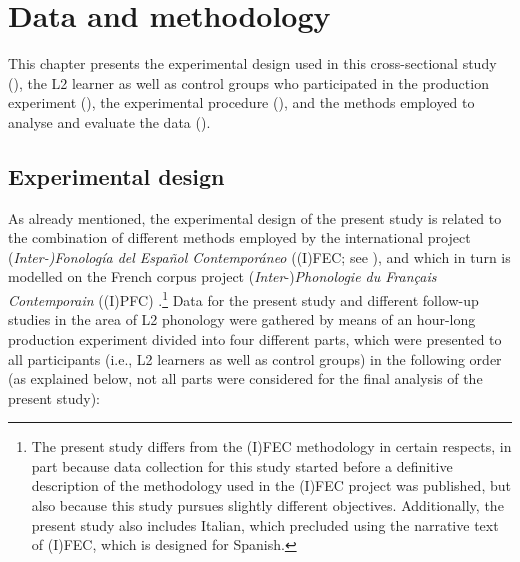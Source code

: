 \chapter{Data and methodology}\label{ch:3}

This chapter presents the experimental design used in this cross-sectional study (), the L2 learner as well as control groups who participated in the production experiment (), the experimental procedure (), and the methods employed to analyse and evaluate the data ().


\section{Experimental design}\label{sec:3.1}

\begin{sloppypar}
As already mentioned, the experimental design of the present study is related to the combination of different methods employed by the international project (\textit{Inter-)Fonología del Español Contemporáneo} ((I)FEC; see \citealt{PustkaEtAl2016,PustkaEtAl2018}), and which in turn is modelled on the French corpus project (\textit{Inter}{}-)\textit{Phonologie du Français Contemporain} ((I)PFC) \citep{RacineEtAl2012}.\footnote{The present study differs from the (I)FEC methodology in certain respects, in part because data collection for this study started before a definitive description of the methodology used in the (I)FEC project was published, but also because this study pursues slightly different objectives. Additionally, the present study also includes Italian, which precluded using the narrative text of (I)FEC, which is designed for Spanish.} Data for the present study and different follow-up studies in the area of L2 phonology were gathered by means of an hour-long production experiment divided into four different parts, which were presented to all participants (i.e., L2 learners as well as control groups) in the following order (as explained below, not all parts were considered for the final analysis of the present study):
\end{sloppypar}\largerpage[-2]

